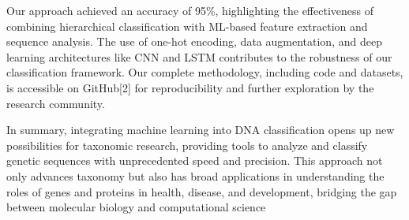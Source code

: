 Our approach achieved an accuracy of 95\%, highlighting the effectiveness of combining hierarchical classification with ML-based feature extraction and sequence analysis. The use of one-hot encoding, data augmentation, and deep learning architectures like CNN and LSTM contributes to the robustness of our classification framework. Our complete methodology, including code and datasets, is accessible on GitHub[2] for reproducibility and further exploration by the research community.

In summary, integrating machine learning into DNA classification opens up new possibilities for taxonomic research, providing tools to analyze and classify genetic sequences with unprecedented speed and precision. This approach not only advances taxonomy but also has broad applications in understanding the roles of genes and proteins in health, disease, and development, bridging the gap between molecular biology and computational science